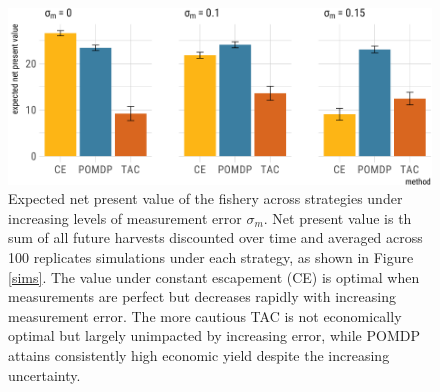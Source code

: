 \documentclass[3p]{elsarticle} %
\makeatletter
\def\maxwidth{\ifdim\Gin@nat@width>\linewidth\linewidth
\else\Gin@nat@width\fi}
\let\Oldincludegraphics\includegraphics
\renewcommand{\includegraphics}[1]{\Oldincludegraphics[width=\maxwidth]{#1}}
\makeatother
\begin{document}
\begin{figure}
\centering
\includegraphics{manuscript_files/figure-latex/econ-1.pdf}
\caption{Expected net present value of the fishery across strategies
under increasing levels of measurement error \(\sigma_m\). Net present
value is th sum of all future harvests discounted over time and averaged
across 100 replicates simulations under each strategy, as shown in
Figure \ref{sims}. The value under constant escapement (CE) is optimal
when measurements are perfect but decreases rapidly with increasing
measurement error. The more cautious TAC is not economically optimal but
largely unimpacted by increasing error, while POMDP attains consistently
high economic yield despite the increasing uncertainty. \label{econ}}
\end{figure}
\end{document}

